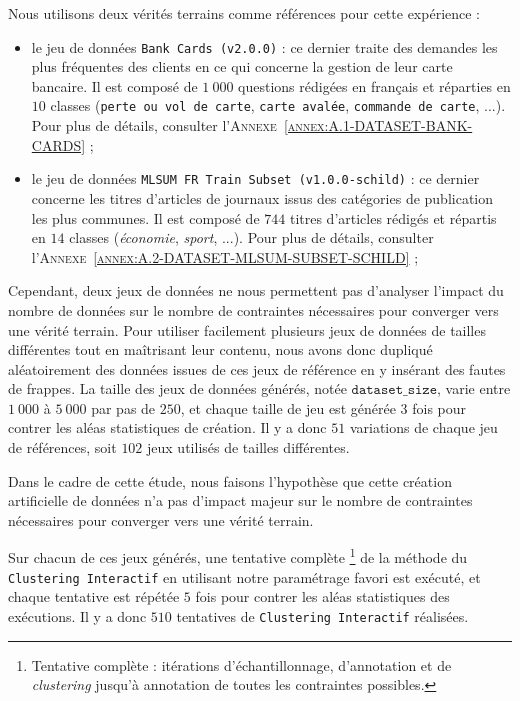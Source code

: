 			Nous utilisons deux vérités terrains comme références pour cette expérience :
			\begin{itemize}
				\item le jeu de données \texttt{Bank Cards (v2.0.0)} :
				ce dernier traite des demandes les plus fréquentes des clients en ce qui concerne la gestion de leur carte bancaire.
				Il est composé de $1~000$ questions rédigées en français et réparties en $10$ classes (\texttt{perte ou vol de carte}, \texttt{carte avalée}, \texttt{commande de carte}, ...).
				Pour plus de détails, consulter l'\textsc{Annexe~\ref{annex:A.1-DATASET-BANK-CARDS}} ;
				\item le jeu de données \texttt{MLSUM FR Train Subset (v1.0.0-schild)} :
				ce dernier concerne les titres d'articles de journaux issus des catégories de publication les plus communes.
				Il est composé de $744$  titres d'articles rédigés et répartis en $14$ classes (\textit{économie}, \textit{sport}, ...).
				Pour plus de détails, consulter l'\textsc{Annexe~\ref{annex:A.2-DATASET-MLSUM-SUBSET-SCHILD}} ;
			\end{itemize}

			Cependant, deux jeux de données ne nous permettent pas d'analyser l'impact du nombre de données sur le nombre de contraintes nécessaires pour converger vers une vérité terrain.
			Pour utiliser facilement plusieurs jeux de données de tailles différentes tout en maîtrisant leur contenu, nous avons donc dupliqué aléatoirement des données issues de ces jeux de référence en y insérant des fautes de frappes.
			La taille des jeux de données générés, notée $\texttt{dataset\_size}$, varie entre $1~000$ à $5~000$ par pas de $250$, et chaque taille de jeu est générée $3$ fois pour contrer les aléas statistiques de création.
			Il y a donc $51$ variations de chaque jeu de références, soit $102$ jeux utilisés de tailles différentes.
			
			\begin{leftBarWarning}
				Dans le cadre de cette étude, nous faisons l'hypothèse que cette création artificielle de données n'a pas d'impact majeur sur le nombre de contraintes nécessaires pour converger vers une vérité terrain.
			\end{leftBarWarning}
			
			Sur chacun de ces jeux générés, une tentative complète \footnote{
				Tentative complète : itérations d'échantillonnage, d'annotation et de \textit{clustering} jusqu'à annotation de toutes les contraintes possibles.
			}
			de la méthode du \texttt{Clustering Interactif} en utilisant notre paramétrage favori est exécuté, et chaque tentative est répétée $5$ fois pour contrer les aléas statistiques des exécutions.
			Il y a donc $510$ tentatives de \texttt{Clustering Interactif} réalisées.
			
